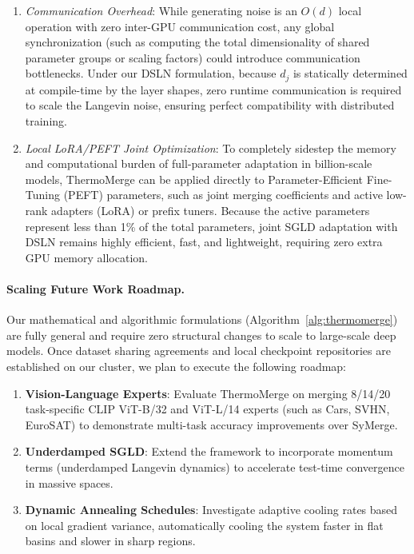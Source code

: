 \begin{enumerate}
In DeepSpeed's ZeRO-3 (Zero Redundancy Optimizer), weights are partitioned across all data-parallel processes.
Since ZeRO-3 gathers the full weights on-the-fly during the forward and backward passes and then partitions them again, we can generate the noise vectors directly on the full gathered parameters, or perform local noise updates on the sharded parameters to completely avoid any inter-GPU communication or All-Gather overhead.
This guarantees that SGLD adds zero extra communication latency, maintaining maximum training throughput.
\item \emph{Communication Overhead}: While generating noise is an $O(d)$ local operation with zero inter-GPU communication cost, any global synchronization (such as computing the total dimensionality of shared parameter groups or scaling factors) could introduce communication bottlenecks.
Under our DSLN formulation, because $d_j$ is statically determined at compile-time by the layer shapes, zero runtime communication is required to scale the Langevin noise, ensuring perfect compatibility with distributed training.
\item \emph{Local LoRA/PEFT Joint Optimization}: To completely sidestep the memory and computational burden of full-parameter adaptation in billion-scale models, ThermoMerge can be applied directly to Parameter-Efficient Fine-Tuning (PEFT) parameters, such as joint merging coefficients and active low-rank adapters (LoRA) or prefix tuners.
Because the active parameters represent less than 1\% of the total parameters, joint SGLD adaptation with DSLN remains highly efficient, fast, and lightweight, requiring zero extra GPU memory allocation.
\end{enumerate}

\paragraph{Scaling Future Work Roadmap.} Our mathematical and algorithmic formulations (Algorithm~\ref{alg:thermomerge}) are fully general and require zero structural changes to scale to large-scale deep models.
Once dataset sharing agreements and local checkpoint repositories are established on our cluster, we plan to execute the following roadmap:
\begin{enumerate}
\item \textbf{Vision-Language Experts}: Evaluate ThermoMerge on merging 8/14/20 task-specific CLIP ViT-B/32 and ViT-L/14 experts (such as Cars, SVHN, EuroSAT) to demonstrate multi-task accuracy improvements over SyMerge.
\item \textbf{Underdamped SGLD}: Extend the framework to incorporate momentum terms (underdamped Langevin dynamics) to accelerate test-time convergence in massive spaces.
\item \textbf{Dynamic Annealing Schedules}: Investigate adaptive cooling rates based on local gradient variance, automatically cooling the system faster in flat basins and slower in sharp regions.
\end{enumerate}
